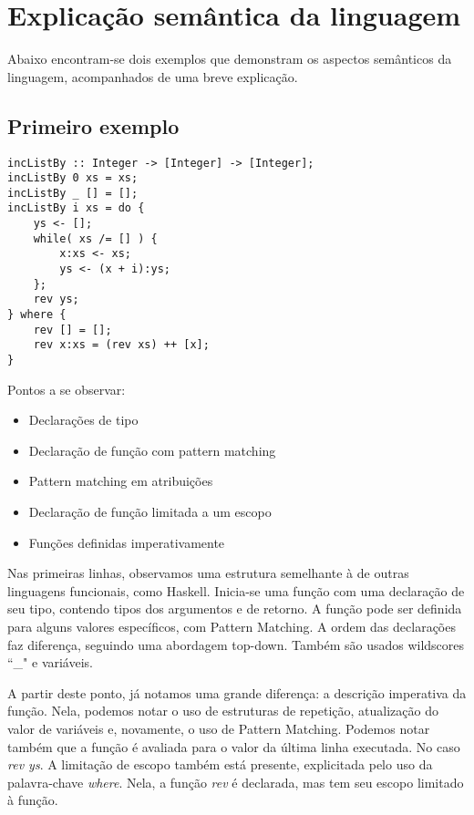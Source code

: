 \documentclass[11pt]{article}
\begin{document}
\section{ Explicação semântica da linguagem }

Abaixo encontram-se dois exemplos que demonstram os aspectos semânticos da linguagem, acompanhados de uma breve explicação.


\subsection{Primeiro exemplo}

\begin{lstlisting}[basicstyle=\small]
incListBy :: Integer -> [Integer] -> [Integer];
incListBy 0 xs = xs;
incListBy _ [] = [];
incListBy i xs = do {
    ys <- [];
    while( xs /= [] ) {
        x:xs <- xs;
        ys <- (x + i):ys;
    };
    rev ys;
} where {
    rev [] = [];
    rev x:xs = (rev xs) ++ [x];
}
\end{lstlisting}


Pontos a se observar:

\begin{itemize}[leftmargin=.5in]
  \item Declarações de tipo
  \item Declaração de função com pattern matching
  \item Pattern matching em atribuições
  \item Declaração de função limitada a um escopo
  \item Funções definidas imperativamente
\end{itemize}

Nas primeiras linhas, observamos uma estrutura semelhante à de outras linguagens funcionais,
como Haskell.
Inicia-se uma função com uma declaração de seu tipo, contendo tipos dos argumentos e de retorno.
A função pode ser definida para alguns valores específicos, com Pattern Matching. 
A ordem das declarações faz diferença, seguindo uma abordagem top-down. 
Também são usados wildscores ``\_" e variáveis.

A partir deste ponto, já notamos uma grande diferença: a descrição imperativa da função. 
Nela, podemos notar o uso de estruturas de repetição, atualização do valor
de variáveis e, novamente, o uso de Pattern Matching. Podemos notar também que a função é avaliada 
para o valor da última linha executada. No caso \emph{rev ys}.
A limitação de escopo também está presente, explicitada pelo uso da palavra-chave \emph{where}. 
Nela, a função \emph{rev} é declarada, mas tem seu escopo limitado à função. 
\end{document}
